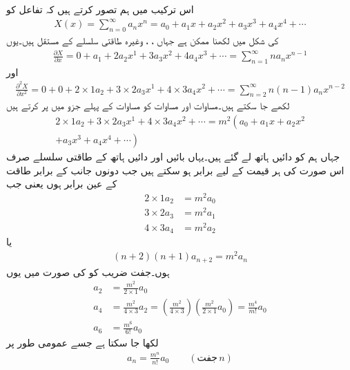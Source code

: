 اس ترکیب میں ہم تصور کرتے ہیں کہ  تفاعل کو 
\begin{align}\label{مساوات_لاپلاس_طاقتی_سلسلہ_الف}
X(x)=\sum_{n=0}^{\infty} a_n x^n=a_0 +a_1x+a_2 x^2+a_3 x^3+a_4 x^4+\cdots
\end{align}
کی شکل میں لکھنا ممکن ہے جہاں ، ،  وغیرہ طاقتی سلسلے کے مستقل ہیں۔یوں 
\begin{align*}
\frac{\partial X}{\partial x}=0 +a_1+2 a_2 x^1+3a_3 x^2+4a_4 x^3+\cdots=\sum_{n=1}^{\infty} n a_n x^{n-1}
\end{align*}
اور
\begin{align}\label{مساوات_لاپلاس_طاقتی_سلسلہ_ب}
\frac{\partial^2 X}{\partial x^2}=0 +0+2 \times 1  a_2+3 \times 2 a_3 x^1+4 \times 3 a_4 x^2+\cdots=\sum_{n=2}^{\infty} n(n-1) a_n x^{n-2}
\end{align}
لکھے جا سکتے ہیں۔مساوات  اور مساوات  کو مساوات  کے پہلے جزو میں پر کرتے ہیں
\begin{multline*}
 2 \times 1  a_2+3 \times 2 a_3 x^1+4 \times 3 a_4 x^2+\cdots =m^2 \left(a_0 +a_1x+a_2 x^2 \right.\\\left. +a_3 x^3+a_4 x^4+\cdots \right)
\end{multline*}  
جہاں ہم  کو دائیں ہاتھ لے گئے ہیں۔یہاں بائیں اور دائیں ہاتھ کے طاقتی سلسلے صرف اس صورت  کی ہر قیمت کے لیے برابر ہو سکتے ہیں جب دونوں جانب   کے برابر طاقت کے  عین برابر ہوں یعنی جب
\begin{align*}
2 \times 1  a_2&=m^2 a_0\\
3 \times 2 a_3&=m^2 a_1\\
4 \times 3 a_4&=m^2 a_2
\end{align*}
یا
\begin{align*}
(n+2)(n+1)a_{n+2}=m^2 a_n
\end{align*}
ہوں۔جفت ضریب کو  کی صورت میں یوں
\begin{align*}
a_2&=\frac{m^2 }{2 \times 1} a_0\\
a_4&=\frac{m^2 }{4 \times 3} a_2=\left(\frac{m^2 }{4 \times 3}\right)\left(\frac{m^2 }{2 \times 1} a_0\right)=\frac{m^4}{m!}a_0\\
a_6&=\frac{m^6}{6!}a_0
\end{align*}
 لکھا جا سکتا ہے جسے عمومی طور پر
\begin{align*}
a_n=\frac{m^{n}}{n!}a_0 \quad \quad (\text{جفت}\, n)
\end{align*}
